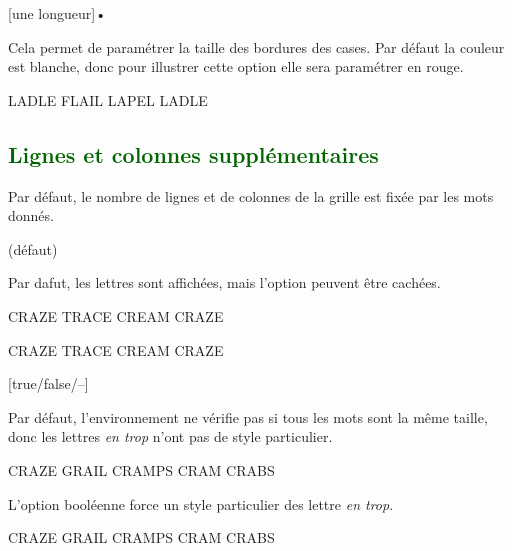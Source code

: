 \documentclass[svgnames]{report}
\newcommand\Section[1]{\subsection{\textcolor{DarkGreen}{#1}}}
\begin{document}
  [une longueur]•

  Cela permet de paramétrer la taille des bordures des cases. Par défaut la couleur est blanche, donc pour illustrer cette option elle sera paramétrer en rouge.

  \begin{example}
  \begin{wordle}[Epaisseur=0.75mm,CouleurBordures=red]{LADLE}
     FLAIL
     LAPEL
     LADLE
  \end{wordle}
  \end{example}

  \Section{Lignes et colonnes supplémentaires}

  Par défaut, le nombre de lignes et de colonnes de la grille est fixée par les mots donnés.

   (défaut)\qquad

  Par dafut, les lettres sont affichées, mais l'option  peuvent être cachées.

  \begin{example}
  \begin{wordle}{CRAZE} %
    TRACE
    CREAM
    CRAZE
  \end{wordle}
  \end{example}

  \begin{example}
  \begin{wordle}[NonLettres]{CRAZE}
    TRACE
    CREAM
    CRAZE
  \end{wordle}
  \end{example}

  [true/false/--]

  Par défaut, l'environnement ne vérifie pas si tous les mots sont la même taille, donc les lettres \textit{en trop} n'ont pas de style particulier.

  \begin{example}
  \begin{wordle}[Strict=false]{CRAZE} %
    GRAIL
    CRAMPS
    CRAM
    CRABS
  \end{wordle}
  \end{example}

  L'option booléenne  force un style particulier des lettre \textit{en trop}.

  \begin{example}
  \begin{wordle}[Strict]{CRAZE}
    GRAIL
    CRAMPS
    CRAM
    CRABS
  \end{wordle}
  \end{example}
\end{document}
